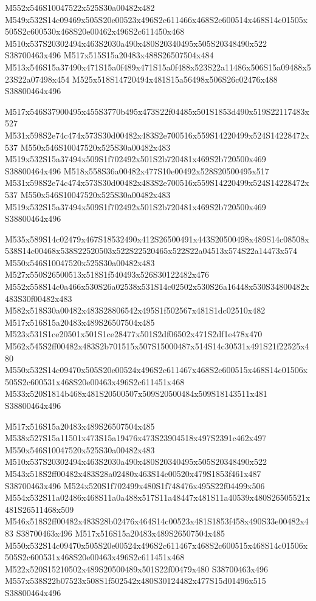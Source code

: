 \documentclass{article}
\begin{document}
\begin{multicols}{2}
M552x546S10047522x525S30a00482x482 M549x532S14c09469x505S20e00523x496S2c611466x468S2c600514x468S14c01505x505S2c600530x468S20e00462x496S2c611450x468 M510x537S20302494x463S2030a490x480S20340495x505S20348490x522 S38700463x496 M517x515S15a20483x488S26507504x484 M513x546S15a37490x471S15a0f489x471S15a0f488x523S22a11486x506S15a09488x523S22a07498x454 M525x518S14720494x481S15a56498x506S26c02476x488 S38800464x496

M517x546S37900495x455S3770b495x473S22f04485x501S1853d490x519S22117483x527 M531x598S2e74c474x573S30d00482x483S2e700516x559S14220499x524S14228472x537 M550x546S10047520x525S30a00482x483 M519x532S15a37494x509S1f702492x501S2b720481x469S2b720500x469 S38800464x496 M518x558S36a00482x477S10e00492x528S20500495x517 M531x598S2e74c474x573S30d00482x483S2e700516x559S14220499x524S14228472x537 M550x546S10047520x525S30a00482x483 M519x532S15a37494x509S1f702492x501S2b720481x469S2b720500x469 S38800464x496

M535x589S14c02479x467S18532490x412S26500491x443S20500498x489S14c08508x538S14c00468x538S22520503x522S22520465x522S22a04513x574S22a14473x574 M550x546S10047520x525S30a00482x483 M527x550S26500513x518S1f540493x526S30122482x476 M552x558S14c0a466x530S26a02538x531S14c02502x530S26a16448x530S34800482x483S30f00482x483 M582x518S30a00482x483S28806542x495S1f502567x481S1dc02510x482 M517x516S15a20483x489S26507504x485 M523x531S1ce20501x501S1ce28477x501S2df06502x471S2df1e478x470 M562x545S2ff00482x483S2b701515x507S15000487x514S14c30531x491S21f22525x480 M550x532S14c09470x505S20e00524x496S2c611467x468S2c600515x468S14c01506x505S2c600531x468S20e00463x496S2c611451x468 M533x520S1814b468x481S20500507x509S20500484x509S18143511x481 S38800464x496

M517x516S15a20483x489S26507504x485 M538x527S15a11501x473S15a19476x473S23904518x497S2391c462x497 M550x546S10047520x525S30a00482x483 M510x537S20302494x463S2030a490x480S20340495x505S20348490x522 M543x518S2ff00482x483S28a02480x463S14c00520x479S1853f461x487 S38700463x496 M524x520S1f702499x480S1f748476x495S22f04499x506 M554x532S11a02486x468S11a0a488x517S11a48447x481S11a40539x480S26505521x481S26511468x509 M546x518S2ff00482x483S28b02476x464S14c00523x481S1853f458x490S33e00482x483 S38700463x496 M517x516S15a20483x489S26507504x485 M550x532S14c09470x505S20e00524x496S2c611467x468S2c600515x468S14c01506x505S2c600531x468S20e00463x496S2c611451x468 M522x520S15210502x489S20500489x501S22f00479x480 S38700463x496 M557x538S22b07523x508S1f502542x480S30124482x477S15d01496x515 S38800464x496


\end{multicols}
\end{document}
